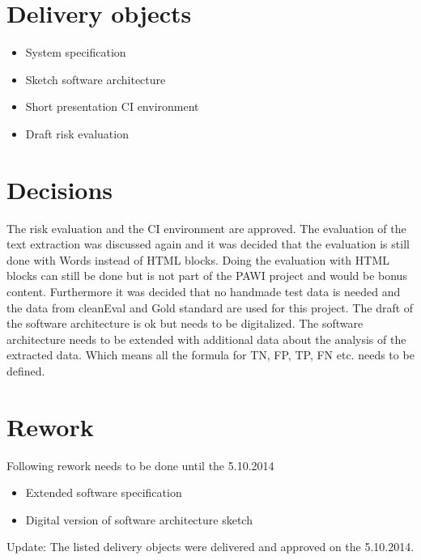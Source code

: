 \section{Delivery objects}

\begin{itemize}
\item System specification
\item Sketch software architecture
\item Short presentation CI environment
\item Draft risk evaluation
\end{itemize}

\section{Decisions}

The risk evaluation and the CI environment are approved. 
The evaluation of the text extraction was discussed again and it was decided that the evaluation is still done with Words instead of HTML blocks. Doing the evaluation with HTML blocks can still be done but is not part of the PAWI project and would be bonus content. 
Furthermore it was decided that no handmade test data is needed and the data from cleanEval and Gold standard are used for this project.
The draft of the software architecture is ok but needs to be digitalized.
The software architecture needs to be extended with additional data about the analysis of the extracted data. Which means all the formula for TN, FP, TP, FN etc. needs to be defined.


\section{Rework}

Following rework needs to be done until the 5.10.2014

\begin{itemize}
\item Extended software specification
\item Digital version of software architecture sketch
\end{itemize}

Update: The listed delivery objects were delivered and approved on the 5.10.2014.




